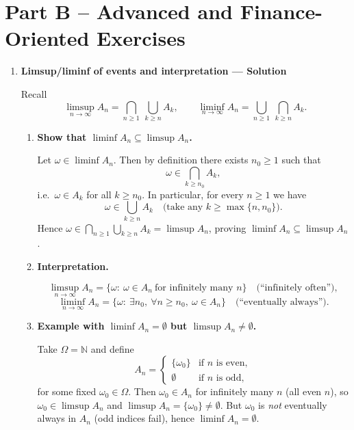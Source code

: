 \documentclass[11pt]{article}
\begin{document}
\section*{Part B -- Advanced and Finance-Oriented Exercises}
\begin{enumerate}



\item \textbf{Limsup/liminf of events and interpretation — Solution}

Recall
\[
\limsup_{n\to\infty}A_n=\bigcap_{n\ge1}\ \bigcup_{k\ge n} A_k,
\qquad
\liminf_{n\to\infty}A_n=\bigcup_{n\ge1}\ \bigcap_{k\ge n} A_k.
\]

\begin{enumerate}[label=(\alph*)]
\item \textbf{Show that $\liminf A_n \subseteq \limsup A_n$.}

Let $\omega\in\liminf A_n$. Then by definition there exists $n_0\ge1$ such that
\[
\omega\in \bigcap_{k\ge n_0}A_k,
\]
i.e.\ $\omega\in A_k$ for all $k\ge n_0$. In particular, for every $n\ge1$ we have
\[
\omega\in \bigcup_{k\ge n}A_k
\quad\text{(take any }k\ge \max\{n,n_0\}\text{)}.
\]
Hence $\omega\in\bigcap_{n\ge1}\bigcup_{k\ge n}A_k=\limsup A_n$, proving
$\liminf A_n\subseteq \limsup A_n$.

\item \textbf{Interpretation.}

\[
\limsup_{n\to\infty}A_n
=
\{\omega:\ \omega\in A_n\ \text{for infinitely many }n\}
\quad\text{(``infinitely often'')},
\]
\[
\liminf_{n\to\infty}A_n
=
\{\omega:\ \exists n_0,\ \forall n\ge n_0,\ \omega\in A_n\}
\quad\text{(``eventually always'')}.
\]

\item \textbf{Example with $\liminf A_n=\emptyset$ but $\limsup A_n\neq\emptyset$.}

Take $\Omega=\mathbb{N}$ and define
\[
A_n=
\begin{cases}
\{\omega_0\} & \text{if } n \text{ is even},\\
\emptyset & \text{if } n \text{ is odd},
\end{cases}
\]
for some fixed $\omega_0\in\Omega$.
Then $\omega_0\in A_n$ for infinitely many $n$ (all even $n$), so $\omega_0\in\limsup A_n$
and $\limsup A_n=\{\omega_0\}\neq\emptyset$.
But $\omega_0$ is \emph{not} eventually always in $A_n$ (odd indices fail), hence
$\liminf A_n=\emptyset$.
\end{enumerate}


\end{enumerate}
\end{document}
